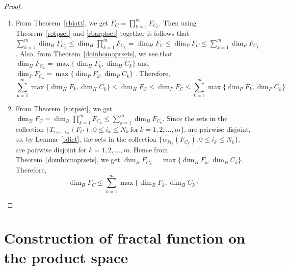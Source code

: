 \documentclass[10pt]{amsart}
\theoremstyle{definition}
\begin{document}
	\begin{proof}
		\begin{enumerate}
			\item From  Theorem~\ref{rbiatt}, we get $F_C=\prod_{k=1}^mF_{C_k}$. Then using Theorem~\ref{rotpset} and \ref{rbarptset} together it follows that $\sum_{k=1}^{m}\dim_HF_{C_k}\leq\dim_H\prod_{k=1}^mF_{C_k}=\dim_HF_C\leq\dim_PF_C\leq\sum_{k=1}^{m}\dim_PF_{C_k}$. Also, from Theorem~\ref{doinhomoprsets}, we see that  $\dim_HF_{C_k}=\max\{\dim_HF_{k},\dim_HC_k\}$ and $\dim_PF_{C_k}=\max\{\dim_PF_{k},\dim_PC_k\}$ . Therefore, $$\sum_{k=1}^{m}\max\{\dim_HF_k,\dim_HC_k\}\leq\dim_HF_C\leq\dim_PF_C\leq \sum_{k=1}^{m}\max\{\dim_PF_k,\dim_PC_k\}$$
			\item From Theorem~\ref{rotpset}, we get $\overline{\dim}_BF_C= \overline{\dim}_B\prod_{k=1}^mF_{C_k}\leq\sum_{k=1}^m\overline{\dim}_BF_{C_k}$. Since the sets in the collection $\{T_{i_1i_2\cdots i_m}(F_C):0\leq i_k\leq N_k~\mbox{for}~k=1,2,\ldots,m\}$, are pairwise disjoint, so, by Lemma~\ref{tdict}, the sets in the collection $\{w_{ki_k}(F_{C_k}):0\leq i_k\leq N_k\}$, are pairwise disjoint for $k=1,2,\ldots,m$. Hence from  Theorem~\ref{doinhomoprsets}, we get $\overline{\dim}_BF_{C_k}=\max\{\overline{\dim}_BF_k,\overline{\dim}_BC_k\}$. Therefore, $$\overline{\dim}_BF_C\leq\sum_{k=1}^{m}\max\{\overline{\dim}_BF_k,\overline{\dim}_BC_k\}$$
		\end{enumerate}
	\end{proof}
	
	\section{Construction of fractal function on the product space}\label{secpfs}
	
\end{document}
